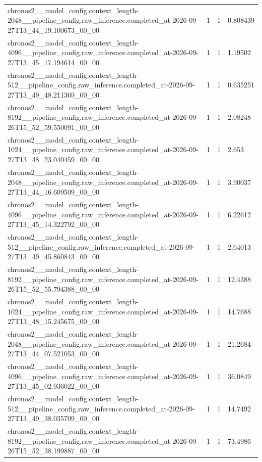 \begin{tabular}{llll}
chronos2\_\_model\_config.context\_length-2048\_\_pipeline\_config.raw\_inference.completed\_at-2026-09-27T13\_44\_19.100673\_00\_00 & 1 & 1 & 0.808439 \\
chronos2\_\_model\_config.context\_length-4096\_\_pipeline\_config.raw\_inference.completed\_at-2026-09-27T13\_45\_17.194614\_00\_00 & 1 & 1 & 1.19502 \\
chronos2\_\_model\_config.context\_length-512\_\_pipeline\_config.raw\_inference.completed\_at-2026-09-27T13\_49\_48.211369\_00\_00 & 1 & 1 & 0.635251 \\
chronos2\_\_model\_config.context\_length-8192\_\_pipeline\_config.raw\_inference.completed\_at-2026-09-26T15\_52\_59.550091\_00\_00 & 1 & 1 & 2.08248 \\
chronos2\_\_model\_config.context\_length-1024\_\_pipeline\_config.raw\_inference.completed\_at-2026-09-27T13\_48\_23.040459\_00\_00 & 1 & 1 & 2.653 \\
chronos2\_\_model\_config.context\_length-2048\_\_pipeline\_config.raw\_inference.completed\_at-2026-09-27T13\_44\_16.609509\_00\_00 & 1 & 1 & 3.90037 \\
chronos2\_\_model\_config.context\_length-4096\_\_pipeline\_config.raw\_inference.completed\_at-2026-09-27T13\_45\_14.322792\_00\_00 & 1 & 1 & 6.22612 \\
chronos2\_\_model\_config.context\_length-512\_\_pipeline\_config.raw\_inference.completed\_at-2026-09-27T13\_49\_45.860843\_00\_00 & 1 & 1 & 2.64013 \\
chronos2\_\_model\_config.context\_length-8192\_\_pipeline\_config.raw\_inference.completed\_at-2026-09-26T15\_52\_55.794388\_00\_00 & 1 & 1 & 12.4388 \\
chronos2\_\_model\_config.context\_length-1024\_\_pipeline\_config.raw\_inference.completed\_at-2026-09-27T13\_48\_15.245675\_00\_00 & 1 & 1 & 14.7688 \\
chronos2\_\_model\_config.context\_length-2048\_\_pipeline\_config.raw\_inference.completed\_at-2026-09-27T13\_44\_07.521053\_00\_00 & 1 & 1 & 21.2684 \\
chronos2\_\_model\_config.context\_length-4096\_\_pipeline\_config.raw\_inference.completed\_at-2026-09-27T13\_45\_02.936022\_00\_00 & 1 & 1 & 36.0849 \\
chronos2\_\_model\_config.context\_length-512\_\_pipeline\_config.raw\_inference.completed\_at-2026-09-27T13\_49\_38.035709\_00\_00 & 1 & 1 & 14.7492 \\
chronos2\_\_model\_config.context\_length-8192\_\_pipeline\_config.raw\_inference.completed\_at-2026-09-26T15\_52\_38.199887\_00\_00 & 1 & 1 & 73.4986 \\

\end{tabular}
